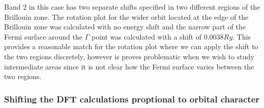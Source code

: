 {{{Band $2$ in this case has two separate shifts specified in two different regions of the Brillouin zone. The rotation plot for the wider orbit located at the edge of the Brillouin zone was calculated with no energy shift and the narrow part of the Fermi surface around the $\Gamma$ point was calculated with a shift of $0.0038\unit{Ry}$. This provides a reasonable match for the rotation plot where we can apply the shift to the two regions discretely, however is proves problematic when we wish to study intermediate areas since it is not clear how the Fermi surface varies between the two regions.

\subsubsection{Shifting the DFT calculations proptional to orbital character}
\label{Sec:ShiftingDFTPropToOrbitalCharacter}

}}}
